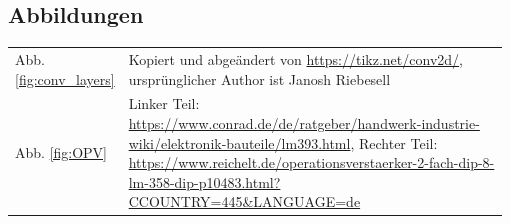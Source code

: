 \documentclass[10pt]{article}
\begin{document}
\subsection{Abbildungen}
\begin{table}[h!]
    \renewcommand*{\arraystretch}{1.2}
    \centering
    {
    \setlength{\tabcolsep}{0pt}
    \begin{tabular}{p{0.08\linewidth}p{0.9\linewidth}}
        Abb. \ref{fig:conv_layers} %
        & Kopiert und abgeändert von \href{https://tikz.net/conv2d/}{https://tikz.net/conv2d/}, ursprünglicher Author ist Janosh Riebesell  \\
        Abb. \ref{fig:OPV} %
        & Linker Teil: \href{https://www.conrad.de/de/ratgeber/handwerk-industrie-wiki/elektronik-bauteile/lm393.html}{https://www.conrad.de/de/ratgeber/handwerk-industrie-wiki/elektronik-bauteile/lm393.html}, Rechter Teil: \href{https://www.reichelt.de/operationsverstaerker-2-fach-dip-8-lm-358-dip-p10483.html?CCOUNTRY=445\&LANGUAGE=de}{https://www.reichelt.de/operationsverstaerker-2-fach-dip-8-lm-358-dip-p10483.html?CCOUNTRY=445\&LANGUAGE=de}\\
    \end{tabular}
    }
    \label{tab:my_label}
\end{table}
\printbibliography[title={Literatur}, keyword={Literatur}]
\printbibliography[title={Anderes}, notkeyword={Literatur}]
\end{document}
